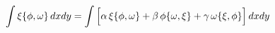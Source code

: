 \documentclass[preview]{standalone}
\begin{document}
\begin{align*}
\special{dvisvgm:raw <g id='unique000'>}\int \xi\{\phi,\omega\}\,dxdy = \int \Big[\alpha\,\xi\{\phi,\omega\} + \beta\,\phi\{\omega,\xi\} + \gamma\,\omega\{\xi,\phi\}\Big]\, dxdy\special{dvisvgm:raw </g>}
\end{align*}
\end{document}
